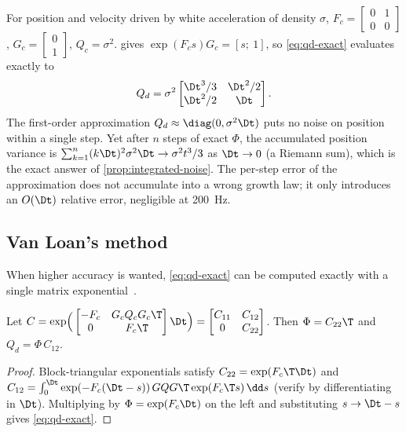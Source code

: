 \begin{example}
\label{ex:double-integrator-qd}
For position and velocity driven by white acceleration of density $\sigma$, $F_c = \begin{bmatrix}0&1\\0&0\end{bmatrix}$,
$G_c = \begin{bmatrix}0\\1\end{bmatrix}$, $Q_c = \sigma^2$.  gives $\exp(F_cs)G_c = [s;\ 1]$, so
\eqref{eq:qd-exact} evaluates exactly to
\begin{equation}
  Q_d = \sigma^2\begin{bmatrix} \Dt^3/3 & \Dt^2/2 \\ \Dt^2/2 & \Dt \end{bmatrix}.
\end{equation}
The first-order approximation $Q_d \approx \diag(0, \sigma^2\Dt)$ puts no noise on position within a single
step. Yet after $n$ steps of exact $\Phi$, the accumulated position variance is
$\sum_{k=1}^{n} (k\Dt)^2\sigma^2\Dt \to \sigma^2 t^3/3$ as $\Dt\to0$ (a Riemann sum), which is the exact
answer of \cref{prop:integrated-noise}. The per-step error of the approximation does not accumulate into
a wrong growth law; it only introduces an $O(\Dt)$ relative error, negligible at 200~Hz.
\end{example}

\subsection{Van Loan's method}

When higher accuracy is wanted, \eqref{eq:qd-exact} can be computed exactly with a single matrix
exponential~\cite{vanloan1978}.

\begin{proposition}
\label{prop:vanloan}
Let $C = \exp\!\Big(\begin{bmatrix} -F_c & G_cQ_cG_c\T \\ 0 & F_c\T \end{bmatrix}\Dt\Big)
= \begin{bmatrix} C_{11} & C_{12} \\ 0 & C_{22}\end{bmatrix}$. Then $\Phi = C_{22}\T$ and $Q_d = \Phi\, C_{12}$.
\end{proposition}
\begin{proof}
Block-triangular exponentials satisfy $C_{22} = \exp(F_c\T\Dt)$ and
$C_{12} = \int_0^\Dt \exp(-F_c(\Dt - s))\,GQG\T\exp(F_c\T s)\,\dd s$ (verify by differentiating in $\Dt$).
Multiplying by $\Phi = \exp(F_c\Dt)$ on the left and substituting $s\to\Dt-s$ gives \eqref{eq:qd-exact}.
\end{proof}

